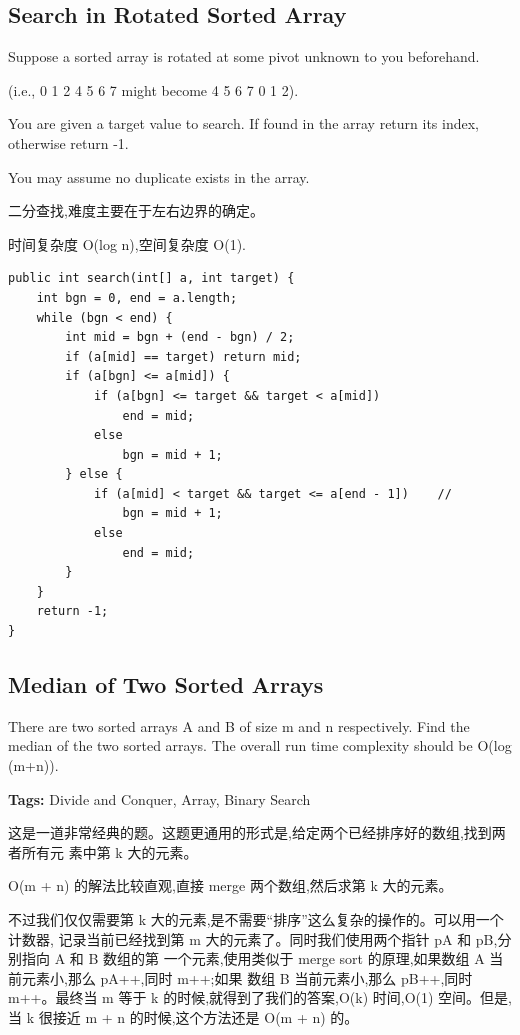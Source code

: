 \documentclass[12pt]{book}
\begin{document}
\subsection{Search in Rotated Sorted Array}
\label{sec-1-3-1}
Suppose a sorted array is rotated at some pivot unknown to you beforehand.

(i.e., 0 1 2 4 5 6 7 might become 4 5 6 7 0 1 2).

You are given a target value to search. If found in the array return its index, otherwise return -1.

You may assume no duplicate exists in the array.

二分查找,难度主要在于左右边界的确定。

时间复杂度 O(log n),空间复杂度 O(1). 

\lstset{language=java,label= ,caption= ,numbers=none}
\begin{lstlisting}
public int search(int[] a, int target) {
    int bgn = 0, end = a.length;
    while (bgn < end) {
        int mid = bgn + (end - bgn) / 2;
        if (a[mid] == target) return mid;
        if (a[bgn] <= a[mid]) {
            if (a[bgn] <= target && target < a[mid])
                end = mid;
            else
                bgn = mid + 1;
        } else {
            if (a[mid] < target && target <= a[end - 1])    //
                bgn = mid + 1;
            else
                end = mid;
        }
    }
    return -1;
}
\end{lstlisting}

\subsection{Median of Two Sorted Arrays}
\label{sec-1-3-2}
There are two sorted arrays A and B of size m and n respectively. Find the median of the two sorted arrays. The overall run time complexity should be O(log (m+n)).

\textbf{Tags:} Divide and Conquer, Array, Binary Search

这是一道非常经典的题。这题更通用的形式是,给定两个已经排序好的数组,找到两者所有元
素中第 k 大的元素。

O(m + n) 的解法比较直观,直接 merge 两个数组,然后求第 k 大的元素。

不过我们仅仅需要第 k 大的元素,是不需要“排序”这么复杂的操作的。可以用一个计数器,
记录当前已经找到第 m 大的元素了。同时我们使用两个指针 pA 和 pB,分别指向 A 和 B 数组的第
一个元素,使用类似于 merge sort 的原理,如果数组 A 当前元素小,那么 pA++,同时 m++;如果
数组 B 当前元素小,那么 pB++,同时 m++。最终当 m 等于 k 的时候,就得到了我们的答案,O(k)
时间,O(1) 空间。但是,当 k 很接近 m + n 的时候,这个方法还是 O(m + n) 的。
\end{document}
